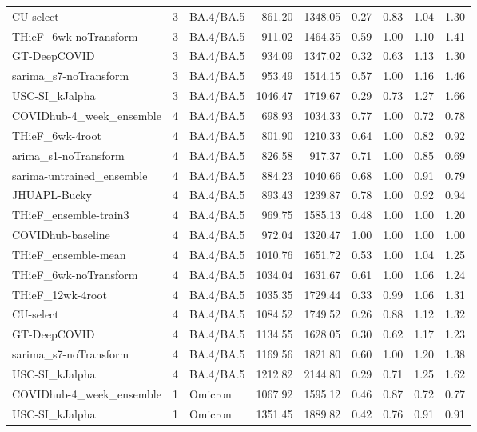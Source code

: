 \documentclass[12pt]{article}
\begin{document}
\begin{longtable}{lrlrrrrrr}
  CU-select & 3 & BA.4/BA.5 & 861.20 & 1348.05 & 0.27 & 0.83 & 1.04 & 1.30 \\ 
  THieF\_6wk-noTransform & 3 & BA.4/BA.5 & 911.02 & 1464.35 & 0.59 & 1.00 & 1.10 & 1.41 \\ 
  GT-DeepCOVID & 3 & BA.4/BA.5 & 934.09 & 1347.02 & 0.32 & 0.63 & 1.13 & 1.30 \\ 
  sarima\_s7-noTransform & 3 & BA.4/BA.5 & 953.49 & 1514.15 & 0.57 & 1.00 & 1.16 & 1.46 \\ 
  USC-SI\_kJalpha & 3 & BA.4/BA.5 & 1046.47 & 1719.67 & 0.29 & 0.73 & 1.27 & 1.66 \\ 
  COVIDhub-4\_week\_ensemble & 4 & BA.4/BA.5 & 698.93 & 1034.33 & 0.77 & 1.00 & 0.72 & 0.78 \\ 
  THieF\_6wk-4root & 4 & BA.4/BA.5 & 801.90 & 1210.33 & 0.64 & 1.00 & 0.82 & 0.92 \\ 
  arima\_s1-noTransform & 4 & BA.4/BA.5 & 826.58 & 917.37 & 0.71 & 1.00 & 0.85 & 0.69 \\ 
  sarima-untrained\_ensemble & 4 & BA.4/BA.5 & 884.23 & 1040.66 & 0.68 & 1.00 & 0.91 & 0.79 \\ 
  JHUAPL-Bucky & 4 & BA.4/BA.5 & 893.43 & 1239.87 & 0.78 & 1.00 & 0.92 & 0.94 \\ 
  THieF\_ensemble-train3 & 4 & BA.4/BA.5 & 969.75 & 1585.13 & 0.48 & 1.00 & 1.00 & 1.20 \\ 
  COVIDhub-baseline & 4 & BA.4/BA.5 & 972.04 & 1320.47 & 1.00 & 1.00 & 1.00 & 1.00 \\ 
  THieF\_ensemble-mean & 4 & BA.4/BA.5 & 1010.76 & 1651.72 & 0.53 & 1.00 & 1.04 & 1.25 \\ 
  THieF\_6wk-noTransform & 4 & BA.4/BA.5 & 1034.04 & 1631.67 & 0.61 & 1.00 & 1.06 & 1.24 \\ 
  THieF\_12wk-4root & 4 & BA.4/BA.5 & 1035.35 & 1729.44 & 0.33 & 0.99 & 1.06 & 1.31 \\ 
  CU-select & 4 & BA.4/BA.5 & 1084.52 & 1749.52 & 0.26 & 0.88 & 1.12 & 1.32 \\ 
  GT-DeepCOVID & 4 & BA.4/BA.5 & 1134.55 & 1628.05 & 0.30 & 0.62 & 1.17 & 1.23 \\ 
  sarima\_s7-noTransform & 4 & BA.4/BA.5 & 1169.56 & 1821.80 & 0.60 & 1.00 & 1.20 & 1.38 \\ 
  USC-SI\_kJalpha & 4 & BA.4/BA.5 & 1212.82 & 2144.80 & 0.29 & 0.71 & 1.25 & 1.62 \\ 
  COVIDhub-4\_week\_ensemble & 1 & Omicron & 1067.92 & 1595.12 & 0.46 & 0.87 & 0.72 & 0.77 \\ 
  USC-SI\_kJalpha & 1 & Omicron & 1351.45 & 1889.82 & 0.42 & 0.76 & 0.91 & 0.91 \\ 

\end{longtable}
\end{document}
